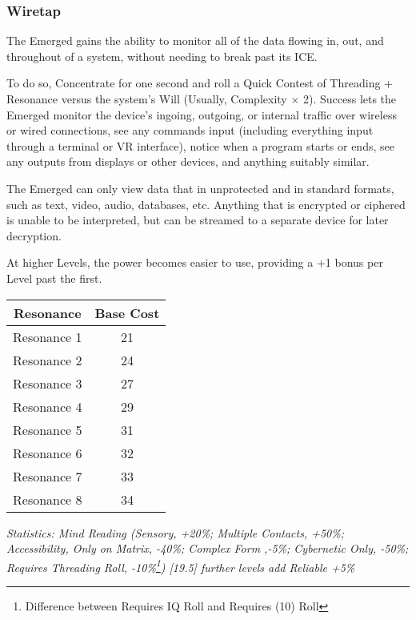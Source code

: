 \begin{multicols*}{3}
	\subsubsection*{Wiretap}\label{wiretap}
	
	The Emerged gains the ability to monitor all of the data flowing in, out, and throughout of a system, without needing to break past its ICE.
	
	To do so, Concentrate for one second and roll a Quick Contest of Threading + Resonance versus the system's Will (Usually, Complexity $\times$ 2). Success lets the Emerged monitor the device's ingoing, outgoing, or internal traffic over wireless or wired connections, see any commands input (including everything input through a terminal or VR interface), notice when a program starts or ends, see any outputs from displays or other devices, and anything suitably similar. 
	
	The Emerged can only view data that in unprotected and in standard formats, such as text, video, audio, databases, etc. Anything that is encrypted or ciphered is unable to be interpreted, but can be streamed to a separate device for later decryption.
	
	At higher Levels, the power becomes easier to use, providing a +1 bonus per Level past the first.
	
	\begin{center}
		\begin{tabular}{|c|c|}
			\hline
			Resonance & Base Cost\\
			\hline
			\hline
			Resonance 1 & 21 \\
			Resonance 2 & 24 \\
			Resonance 3 & 27 \\
			Resonance 4 & 29 \\
			Resonance 5 & 31 \\
			Resonance 6 & 32 \\
			Resonance 7 & 33 \\
			Resonance 8 & 34 \\
			\hline
		\end{tabular}
	\end{center}	
	
	\textcolor{OliveGreen}{\textit{Statistics: Mind Reading (Sensory, +20\%; Multiple Contacts, +50\%; Accessibility, Only on Matrix, -40\%; Complex Form ,-5\%; Cybernetic Only, -50\%; Requires Threading Roll, -10\%\footnote{Difference between Requires IQ Roll and Requires (10) Roll}) [19.5] further levels add Reliable +5\%}}
	

\end{multicols*}
